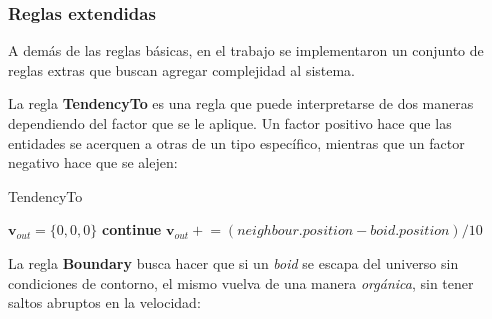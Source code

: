 \documentclass[a4paper]{article}
\begin{document}
            \subsubsection{Reglas extendidas}
                A demás de las reglas básicas, en el trabajo se implementaron un conjunto de reglas extras que buscan agregar complejidad al sistema.

                La regla \textbf{TendencyTo} es una regla que puede interpretarse de dos maneras dependiendo del factor que se le aplique.
                Un factor positivo hace que las entidades se acerquen a otras de un tipo específico, mientras que un factor negativo hace que se alejen:

                \begin{algorithm}
                    \caption{TendencyTo}\label{pseudo:tendency_to}
                    \begin{algorithmic}[1]
                            \State $\bm{v}_{out} = \{0, 0, 0\}$
                                    \State \textbf{continue}
                                \EndIf
                                \State $\bm{v}_{out} \mathrel{+}= (neighbour.position - boid.position) / 10$
                            \EndFor
                        \EndProcedure
                    \end{algorithmic}
                \end{algorithm}

                \pagebreak

                La regla \textbf{Boundary} busca hacer que si un \textit{boid} se escapa del universo sin condiciones de contorno, el mismo vuelva de una manera \textit{orgánica},
                sin tener saltos abruptos en la velocidad:
\end{document}
